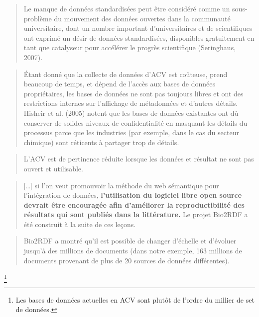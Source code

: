\blockcquote[traduction, p.14]{sayan_contribution_2011}{
Le manque de données standardisées peut être considéré comme un  sous-problème du mouvement des données ouvertes dans la communauté universitaire, dont un nombre important d'universitaires et de scientifiques ont exprimé un désir de données standardisées, disponibles gratuitement en tant que catalyseur pour accélérer le progrès scientifique (Seringhaus, 2007).
}
\blockcquote[traduction, p.22]{sayan_contribution_2011}{
Étant donné que la collecte de données d'ACV est coûteuse, prend beaucoup de temps, et dépend de l'accès aux bases de données propriétaires, les bases de données ne sont pas toujours libres et ont des restrictions internes sur l'affichage de métadonnées et d'autres détails.
Hisheir et al. (2005) notent que les bases de données existantes ont dû conserver de solides niveaux de confidentialité en masquant les détails du processus parce que les industries (par exemple, dans le cas du secteur chimique) sont réticents à partager trop de détails.
}
\blockcquote[Conclusion, traduction p.104]{sayan_contribution_2011}{
L'ACV est de pertinence réduite lorsque les données et résultat ne sont pas ouvert et utilisable.
}

\blockcquote[traduction]{belleau_bio2rdf:_2008}{
[\ldots] si l'on veut promouvoir la méthode du web sémantique pour l'intégration de données, \textbf{l'utilisation du logiciel libre open source devrait être encouragée afin d'améliorer la reproductibilité des résultats qui sont publiés dans la littérature.}
Le projet Bio2RDF a été construit à la suite de ces leçons.
}
\blockcquote[traduction]{belleau_bio2rdf:_2008}{
Bio2RDF a montré qu'il est possible de changer d'échelle et d'évoluer jusqu'à des millions de documents (dans notre exemple, 163 millions de documents provenant de plus de 20 sources de données différentes).
}\footnote{Les bases de données actuelles en \gls{ACV} sont plutôt de l'ordre du millier de set de données.}

